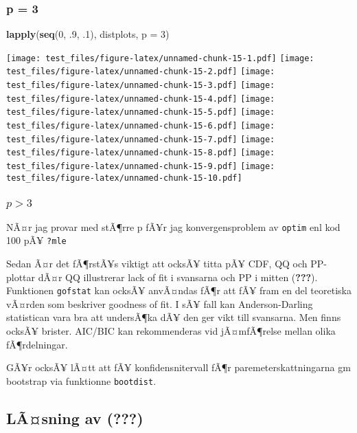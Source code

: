 \documentclass[]{article}
\newenvironment{Shaded}{\begin{snugshade}}{\end{snugshade}}
\newcommand{\KeywordTok}[1]{\textcolor[rgb]{0.13,0.29,0.53}{\textbf{{#1}}}}
\newcommand{\DataTypeTok}[1]{\textcolor[rgb]{0.13,0.29,0.53}{{#1}}}
\newcommand{\DecValTok}[1]{\textcolor[rgb]{0.00,0.00,0.81}{{#1}}}
\newcommand{\NormalTok}[1]{{#1}}
\begin{document}
\subsubsection{p = 3}\label{p-3}

\begin{Shaded}
\begin{Highlighting}[]
\KeywordTok{lapply}\NormalTok{(}\KeywordTok{seq}\NormalTok{(}\DecValTok{0}\NormalTok{, .}\DecValTok{9}\NormalTok{, .}\DecValTok{1}\NormalTok{), distplots, }\DataTypeTok{p =} \DecValTok{3}\NormalTok{)}
\end{Highlighting}
\end{Shaded}

\texttt{[image: test\_files/figure-latex/unnamed-chunk-15-1.pdf]}
\texttt{[image: test\_files/figure-latex/unnamed-chunk-15-2.pdf]}
\texttt{[image: test\_files/figure-latex/unnamed-chunk-15-3.pdf]}
\texttt{[image: test\_files/figure-latex/unnamed-chunk-15-4.pdf]}
\texttt{[image: test\_files/figure-latex/unnamed-chunk-15-5.pdf]}
\texttt{[image: test\_files/figure-latex/unnamed-chunk-15-6.pdf]}
\texttt{[image: test\_files/figure-latex/unnamed-chunk-15-7.pdf]}
\texttt{[image: test\_files/figure-latex/unnamed-chunk-15-8.pdf]}
\texttt{[image: test\_files/figure-latex/unnamed-chunk-15-9.pdf]}
\texttt{[image: test\_files/figure-latex/unnamed-chunk-15-10.pdf]}

\subsubsection{\texorpdfstring{\(p > 3\)}{p \textgreater{} 3}}\label{p-3-1}

NÃ¤r jag provar med stÃ¶rre p fÃ¥r jag konvergensproblem av
\texttt{optim} enl kod 100 pÃ¥ \texttt{?mle}

Sedan Ã¤r det fÃ¶rstÃ¥s viktigt att ocksÃ¥ titta pÃ¥ CDF, QQ och
PP-plottar dÃ¤r QQ illustrerar lack of fit i svansarna och PP i mitten
({\textbf{???}}). Funktionen \texttt{gofstat} kan ocksÃ¥ anvÃ¤ndas fÃ¶r
att fÃ¥ fram en del teoretiska vÃ¤rden som beskriver goodness of fit. I
sÃ¥ fall kan Anderson-Darling statistican vara bra att undersÃ¶ka dÃ¥
den ger vikt till svansarna. Men finns ocksÃ¥ brister. AIC/BIC kan
rekommenderas vid jÃ¤mfÃ¶relse mellan olika fÃ¶rdelningar.

GÃ¥r ocksÃ¥ lÃ¤tt att fÃ¥ konfidensnitervall fÃ¶r paremeterskattningarna
gm bootstrap via funktionne \texttt{bootdist}.

\subsection{\texorpdfstring{LÃ¤sning av
({\textbf{???}})}{LÃ¤sning av (???)}}\label{lasning-av-distrmod}
\end{document}
